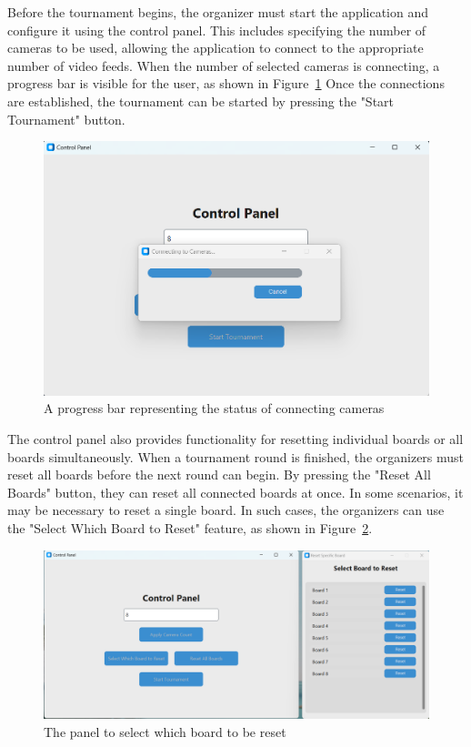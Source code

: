 Before the tournament begins, the organizer must start the application and configure it using the control panel. This includes specifying the number of cameras to be used, allowing the application to connect to the appropriate number of video feeds. When the number of selected cameras is connecting, a progress bar is visible for the user, as shown in Figure~\ref{fig:control-panel-camera} Once the connections are established, the tournament can be started by pressing the "Start Tournament" button. \\
 
\begin{figure}[h!] \centering \includegraphics[width=0.75\linewidth]{figures/results/frontend/controlpanel-camera.png} \caption[Progress bar for camera connections]{A progress bar representing the status of connecting cameras}\label{fig:control-panel-camera} \end{figure}

The control panel also provides functionality for resetting individual boards or all boards simultaneously. When a tournament round is finished, the organizers must reset all boards before the next round can begin. By pressing the "Reset All Boards" button, they can reset all connected boards at once. In some scenarios, it may be necessary to reset a single board. In such cases, the organizers can use the "Select Which Board to Reset" feature, as shown in Figure~\ref{fig:control-panel-reset-boards}.\

\begin{figure}[h!] \centering \includegraphics[width=0.75\linewidth]{figures/results/frontend/controlpanel-reset-boards.png} \caption[Panel to reset a single board]{The panel to select which board to be reset}\label{fig:control-panel-reset-boards} \end{figure}

